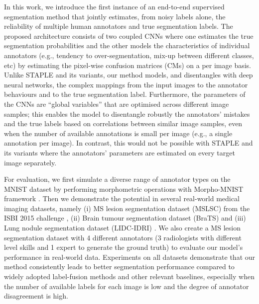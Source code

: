 In this work, we introduce the first instance of an end-to-end supervised segmentation method that jointly estimates, from noisy labels alone, the reliability of multiple human annotators and true segmentation labels. The proposed architecture %
consists of two coupled CNNs where one estimates the true segmentation probabilities and the other models the characteristics of individual annotators (e.g., tendency to over-segmentation, mix-up between different classes, etc) by estimating the pixel-wise confusion matrices (CMs) on a per image basis. Unlike STAPLE \cite{warfield2004simultaneous} and its variants, our method models, and disentangles with deep neural networks, the complex mappings from the input images to the annotator behaviours and to the true segmentation label. Furthermore, the parameters of the CNNs are ``global variables'' that are optimised across different image samples; this enables the model to disentangle robustly the annotators' mistakes and the true labels based on correlations between similar image samples, even when the number of available annotations is small per image (e.g., a single annotation per image). In contrast, this would not be possible with STAPLE \cite{warfield2004simultaneous} and its variants \cite{asman2012formulating,cardoso2013steps} where the annotators' parameters are estimated on every target image separately.

For evaluation, we first simulate a diverse range of annotator types on the MNIST dataset by performing morphometric operations with Morpho-MNIST framework \cite{castro2019morphomnist}. Then we demonstrate the potential in several real-world medical imaging datasets, namely (i) MS lesion segmentation dataset (MSLSC) from the ISBI 2015 challenge \cite{styner20083d}, (ii) Brain tumour segmentation dataset (BraTS) \cite{menze2014multimodal} and (iii) Lung nodule segmentation dataset (LIDC-IDRI) \cite{armato2011lung}. We also create a MS lesion segmentation dataset with 4 different annotators (3 radiologists with different level skills and 1 expert to generate the ground truth) to evaluate our model's performance in real-world data. Experiments on all datasets demonstrate that our method consistently leads to better segmentation performance compared to widely adopted label-fusion methods and other relevant baselines, especially when the number of available labels for each image is low and the degree of annotator disagreement is high.

